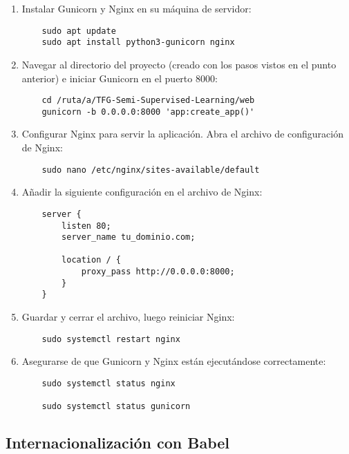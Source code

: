 \begin{enumerate}
    \item Instalar Gunicorn y Nginx en su máquina de servidor:
    \begin{verbatim}
    sudo apt update
    sudo apt install python3-gunicorn nginx
    \end{verbatim}

    \item Navegar al directorio del proyecto (creado con los pasos vistos en el punto anterior) e iniciar Gunicorn en el puerto 8000:
    \begin{verbatim}
    cd /ruta/a/TFG-Semi-Supervised-Learning/web
    gunicorn -b 0.0.0.0:8000 'app:create_app()'
    \end{verbatim}

    \item Configurar Nginx para servir la aplicación. Abra el archivo de configuración de Nginx:
    \begin{verbatim}
    sudo nano /etc/nginx/sites-available/default
    \end{verbatim}

    \item Añadir la siguiente configuración en el archivo de Nginx:
    \begin{verbatim}
    server {
        listen 80;
        server_name tu_dominio.com;

        location / {
            proxy_pass http://0.0.0.0:8000;
        }
    }
    \end{verbatim}

    \item Guardar y cerrar el archivo, luego reiniciar Nginx:
    \begin{verbatim}
    sudo systemctl restart nginx
    \end{verbatim}

    \item Asegurarse de que Gunicorn y Nginx están ejecutándose correctamente:
    \begin{verbatim}
    sudo systemctl status nginx

    sudo systemctl status gunicorn
    \end{verbatim}
\end{enumerate}

\subsection{Internacionalización con Babel}

